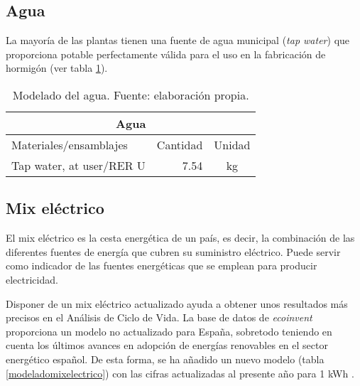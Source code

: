\subsection{Agua}
La mayoría de las plantas tienen una fuente de agua municipal (\textit{tap water}) que proporciona potable perfectamente válida para el uso en la fabricación de hormigón (ver tabla \ref{modeladodelagua}).

\begin{table}[!htb]
\centering
\begin{tabular}{p{8cm}rc}
\toprule
\multicolumn{3}{c}{Agua}\\
\midrule
Materiales/ensamblajes & Cantidad & Unidad\\
\midrule
Tap water, at user/RER U & 7.54 & \si{kg}\\
\bottomrule
\end{tabular}
\caption[Modelado del agua.]{Modelado del agua. Fuente: elaboración propia.}
\label{modeladodelagua}
\end{table}

\subsection{Mix eléctrico}

El mix eléctrico es la cesta energética de un país, es decir, la combinación de las diferentes fuentes de energía que cubren su suministro eléctrico. Puede servir como indicador de las fuentes energéticas que se emplean para producir electricidad.

Disponer de un mix eléctrico actualizado ayuda a obtener unos resultados más precisos en el Análisis de Ciclo de Vida. La base de datos de \textit{ecoinvent} proporciona un modelo no actualizado para España, sobretodo teniendo en cuenta los últimos avances en adopción de energías renovables en el sector energético español. De esta forma, se ha añadido un nuevo modelo (tabla \ref{modeladomixelectrico}) con las cifras actualizadas al presente año para 1 \si{kWh} \cite{mlgceballos}.

